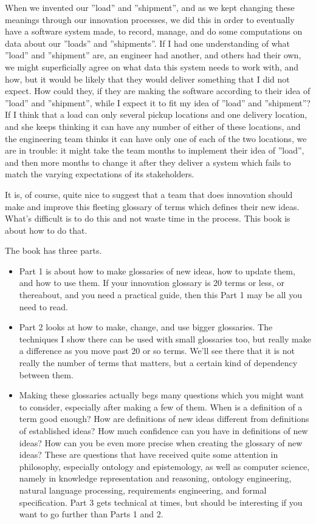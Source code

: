 \documentclass[graybox,envcountchap,sectrefs]{svmono}
\begin{document}
When we invented our ''load'' and ''shipment'', and as we kept changing these meanings through our innovation processes, we did this in order to eventually have a software system made, to record, manage, and do some computations on data about our ''loads'' and ''shipments''. If I had one understanding of what ''load'' and ''shipment'' are, an engineer had another, and others had their own, we might superficially agree on what data this system needs to work with, and how, but it would be likely that they would deliver something that I did not expect. How could they, if they are making the software according to their idea of ''load'' and ''shipment'', while I expect it to fit my idea of ''load'' and ''shipment''? If I think that a load can only several pickup locations and one delivery location, and she keeps thinking it can have any number of either of these locations, and the engineering team thinks it can have only one of each of the two locations, we are in trouble: it might take the team months to implement their idea of ''load'', and then more months to change it after they deliver a system which fails to match the varying expectations of its stakeholders.

It is, of course, quite nice to suggest that a team that does innovation should make and improve this fleeting glossary of terms which defines their new ideas. What's difficult is to do this and not waste time in the process. This book is about how to do that.

The book has three parts.
\begin{itemize}
    \item Part 1 is about how to make glossaries of new ideas, how to update them, and how to use them. If your innovation glossary is 20 terms or less, or thereabout, and you need a practical guide, then this Part 1 may be all you need to read. 
    \item Part 2 looks at how to make, change, and use bigger glossaries. The techniques I show there can be used with small glossaries too, but really make a difference as you move past 20 or so terms. We'll see there that it is not really the number of terms that matters, but a certain kind of dependency between them. 
    \item Making these glossaries actually begs many questions which you might want to consider, especially after making a few of them. When is a definition of a term good enough? How are definitions of new ideas different from definitions of established ideas? How much confidence can you have in definitions of new ideas? How can you be even more precise when creating the glossary of new ideas? These are questions that have received quite some attention in philosophy, especially ontology and epistemology, as well as computer science, namely in knowledge representation and reasoning, ontology engineering, natural language processing, requirements engineering, and formal specification. Part 3 gets technical at times, but should be interesting if you want to go further than Parts 1 and 2.
\end{itemize}
\end{document}
